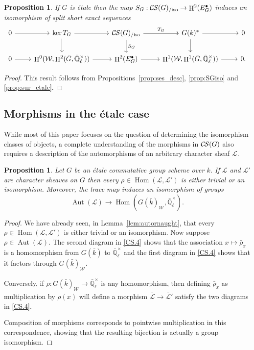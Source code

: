 \documentclass[10pt]{amsart}
\theoremstyle{plain}
\newtheorem{proposition}[theorem]{Proposition}
\theoremstyle{definition}
\theoremstyle{remark}
\newcommand{\EE}{\mathbb{\bar Q}_\ell}
\newcommand{\bFq}{\bar{k}}
\newcommand{\Fq}{k}
\newcommand{\EEx}{\EE^\times}
\newcommand{\Weil}[1]{\mathcal{W}_{#1}}
\DeclareMathOperator{\Aut}{Aut}
\DeclareMathOperator{\Hom}{Hom}
\DeclareMathOperator{\Hh}{H}
\newcommand{\TrFrob}[1]{T_{#1}}
\newcommand{\cs}[1]{{\mathcal{#1}}}
\newcommand{\gcs}[1]{{\mathcal{\bar #1}}}
\newcommand{\CS}{{\mathcal{C\hskip-0.8pt S}}}
\newcommand{\CSiso}[1]{\CS(#1)_{/\text{iso}}}
\newcommand{\brho}{{\bar\rho}}
\begin{document}
\begin{proposition} \label{prop:etale-iso}
 If $G$ is \'etale then the map $S_G : \CSiso{G}\to \Hh^2(E^\bullet_G)$ induces an isomorphism of split short exact sequences
\[
\begin{tikzcd}
 0 \arrow{r} & \ker \TrFrob{G} \arrow{d} \arrow{r} & \CSiso{G}\arrow{d}{S_G} \arrow{r}{\TrFrob{G}} \arrow{r} & G(\Fq)^* \arrow{d} \arrow{r} & 0\\
  0 \arrow{r} & \Hh^0(\Weil{},\Hh^2({\bar G},\EEx)) \arrow{r} & \Hh^2(E^\bullet_G) \arrow{r} & \Hh^1(\Weil{},\Hh^1({\bar G},\EEx)) \arrow{r} & 0.
 \end{tikzcd}
 \]
\end{proposition}
\begin{proof}
This result follows from Propositions~\ref{prop:ses_desc}, \ref{prop:SGiso} and \ref{prop:sur_etale}.
\end{proof}

\subsection{Morphisms in the \'etale case}\label{ssec:mor-etale}

While most of this paper focuses on the question of determining the isomorphism classes of objects, a complete understanding of the morphisms in $\CS(G)$ also requires a description of the automorphisms of an arbitrary character sheaf $\cs{L}$.

\begin{proposition}\label{prop:autornaught_etale}
Let $G$ be an \'etale commutative group scheme over $\Fq$.
If $\cs{L}$ and $\cs{L}'$ are character sheaves on $G$ then
every $\rho\in \Hom(\cs{L},\cs{L}')$ is either trivial or an isomorphism. Moreover, the trace map induces an isomorphism of groups
\[
\Aut(\cs{L}) \to \Hom(G(\bFq)_{\Weil{}}, \EEx).
\]
\end{proposition}

\begin{proof}
We have already seen, in Lemma~\ref{lem:autornaught}, that every $\rho\in \Hom(\cs{L},\cs{L}')$ is either trivial or an isomorphism.
Now suppose $\rho \in \Aut(\cs{L})$.
The second diagram in \ref{CS.4} shows that the association $x \mapsto \brho_x$ is a homomorphism from $G(\bFq)$ to $\EEx$ and the first diagram in \ref{CS.4} shows that it factors through $G(\bFq)_{\Weil{}}$.  

Conversely, if $\rho : G(\bFq)_{\Weil{}} \to \EEx$ is any homomorphism, then defining $\brho_x$ as multiplication by $\rho(x)$ will define a morphism $\gcs{L} \to \gcs{L}'$ satisfy the two diagrams in \ref{CS.4}.  

Composition of morphisms corresponds to pointwise multiplication in this correspondence, showing that the resulting bijection is actually a group isomorphism.
\end{proof}
\end{document}
